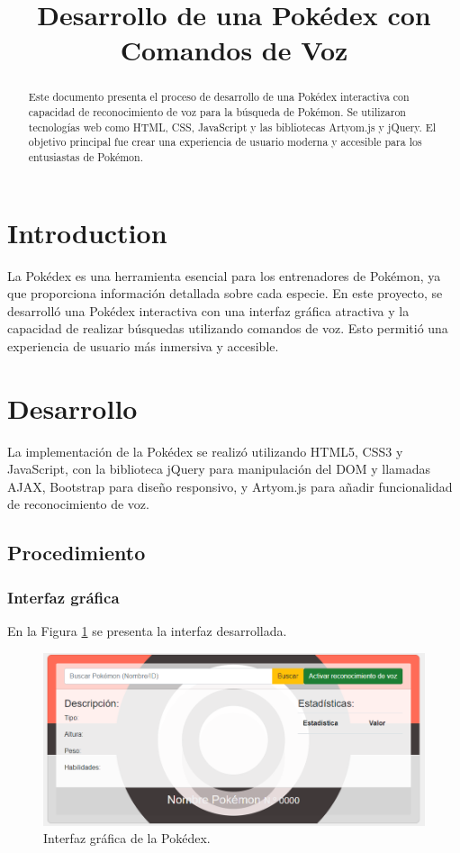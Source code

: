 \documentclass[conference]{IEEEtran}
\title{Desarrollo de una Pokédex con Comandos de Voz}
\author{\IEEEauthorblockN{Michael Rodriguez Rios}}
\begin{document}
\maketitle

\begin{abstract}
Este documento presenta el proceso de desarrollo de una Pokédex interactiva con capacidad de reconocimiento de voz para la búsqueda de Pokémon. Se utilizaron tecnologías web como HTML, CSS, JavaScript y las bibliotecas Artyom.js y jQuery. El objetivo principal fue crear una experiencia de usuario moderna y accesible para los entusiastas de Pokémon.
\end{abstract}

\section{Introduction}

La Pokédex es una herramienta esencial para los entrenadores de Pokémon, ya que proporciona información detallada sobre cada especie. En este proyecto, se desarrolló una Pokédex interactiva con una interfaz gráfica atractiva y la capacidad de realizar búsquedas utilizando comandos de voz. Esto permitió una experiencia de usuario más inmersiva y accesible.

\section{Desarrollo}
La implementación de la Pokédex se realizó utilizando HTML5, CSS3 y JavaScript, con la biblioteca jQuery para manipulación del DOM y llamadas AJAX, Bootstrap para diseño responsivo, y Artyom.js para añadir funcionalidad de reconocimiento de voz.
    
\subsection{Procedimiento}
\subsubsection{Interfaz gráfica}
En la Figura \ref{fig:interfaz} se presenta la interfaz desarrollada.
\begin{figure}[H]
    \centering
    \includegraphics[width=0.8\columnwidth]{Interfaz.png}
    \caption{Interfaz gráfica de la Pokédex.}
    \label{fig:interfaz}
\end{figure}
\end{document}

